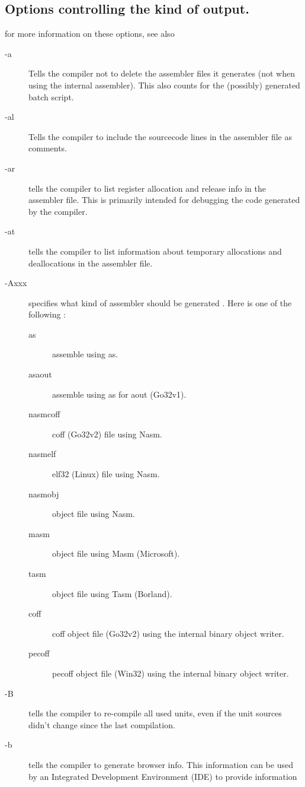 \subsection{Options controlling the kind of output.}
\label{se:codegen}
for more information on these options, see also \progref
\begin{description}
\item [-a]  Tells the compiler not to delete the assembler files
it generates (not when using the internal assembler).
This also counts for the (possibly) generated batch script.
\item [-al]  Tells the compiler to include the sourcecode lines
in the assembler file as comments.
\item[-ar]  tells the compiler to list register allocation and
release info in the assembler file. This is primarily intended for debugging
the code generated by the compiler.
\item[-at]  tells the compiler to list information about
temporary allocations and deallocations in the assembler file.
\item [-Axxx]  specifies what kind of assembler should be generated . Here
 is one of the following :
\begin{description}
\item[as] assemble using \gnu as.
\item[asaout] assemble using \gnu as for aout (Go32v1).
\item[nasmcoff] coff (Go32v2) file using Nasm.
\item[nasmelf] elf32 (Linux) file using Nasm.
\item[nasmobj] object file using Nasm.
\item[masm] object file using Masm (Microsoft).
\item[tasm] object file using Tasm (Borland).
\item[coff] coff object file (Go32v2) using the internal binary object writer.
\item[pecoff] pecoff object file (Win32) using the internal binary object writer.
\end{description}
\item[-B]  tells the compiler to re-compile all used units, even
if the unit sources didn't change since the last compilation.
\item[-b]  tells the compiler to generate browser info. This information can
be used by an Integrated Development Environment (IDE) to provide information

\end{description}
